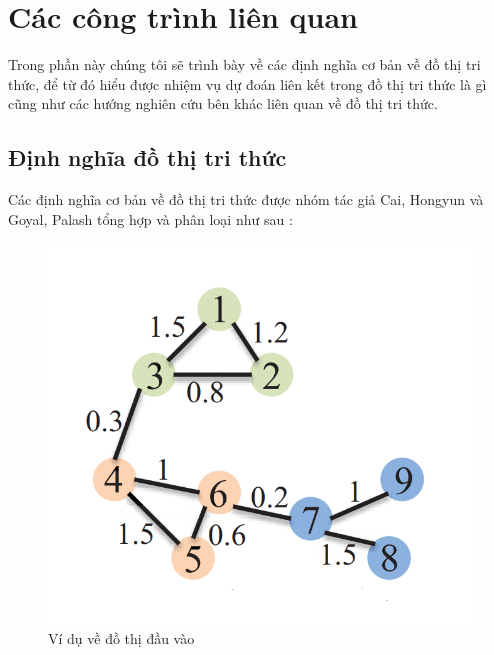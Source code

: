 
\chapter{Các công trình liên quan}
\label{chap:RelatedWork}

Trong phần này chúng tôi sẽ trình bày về các định nghĩa cơ bản về đồ thị tri thức, để từ đó hiểu được nhiệm vụ dự đoán liên kết trong đồ thị tri thức là gì cũng như các hướng nghiên cứu bên khác liên quan về đồ thị tri thức.

\section{Định nghĩa đồ thị tri thức}

Các định nghĩa cơ bản về đồ thị tri thức được nhóm tác giả Cai, Hongyun\cite{cai2018comprehensive} và Goyal, Palash\cite{goyal2018graph} tổng hợp và phân loại như sau :

\begin{figure}[htp]
	\centering
	\includegraphics[width=7 cm]{images/graph_emb_1.png}
	\caption{Ví dụ về đồ thị đầu vào}
	\label{fig:graphInput}
\end{figure}

